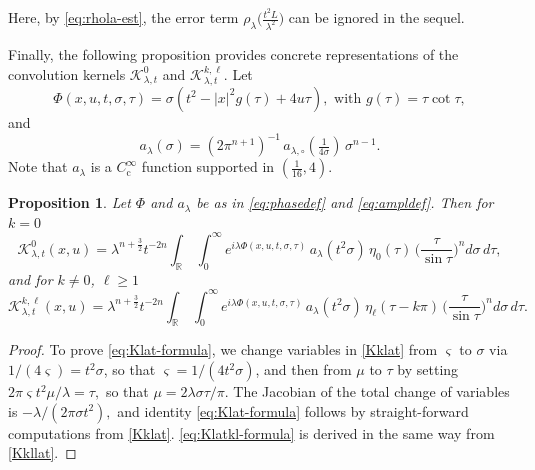 \documentclass[leqno]{amsart}
\newtheorem{proposition}[theorem]{Proposition}
\theoremstyle{definition}
\theoremstyle{remark}
\numberwithin{equation}{section}
\newcommand{\R}{\mathbb{R}}
\newcommand\la{{\lambda}}
\newcommand\Coi{{C^\infty_{\mathrm c}}}
\newcommand\sK{{\mathscr {K}}}
\begin{document}
Here, by \eqref{eq:rhola-est}, the error term $\rho_\lambda\big(\tfrac{t^2L}{\lambda^2}\big)$ can be ignored in the sequel. 
\smallskip

Finally, the  following proposition provides  concrete representations of the convolution kernels $\sK^0_{\la,t}$ and 
$\sK^{k,\ell}_{\la,t}.$  Let
\begin{equation} \label{eq:phasedef}
 \Phi(x,u,t,\sigma,\tau) =\sigma( t^2-|x|^2 g(\tau) +4u\tau), \text{ with } g(\tau)=\tau\cot \tau, 
  \end{equation} and 
 \begin{equation}\label{eq:ampldef}  a_\la(\sigma)=  (2\pi^{n+1})^{-1} \, a_{\la,\circ}(\tfrac 1{4\sigma}) \, \sigma^{n-1}. \end{equation}
 Note that $a_\la$ is a $\Coi $ function  supported in $(\frac 1{16},4)$. 

\begin{proposition}\label{lem:decomp} 
  Let $\Phi$ and  $a_\la$ be as in \eqref{eq:phasedef} and  \eqref{eq:ampldef}. Then for  $k=0$ 
\begin{equation}\label{eq:Klat-formula}
\sK_{\lambda,t}^{0}(x, u) = \lambda^{ n+\frac{3}{2}} t^{-2n} \int_\R \, \int_0^\infty   e^{i\lambda\Phi(x,u,t,\sigma,\tau)} \, a_\lambda(t^2\sigma) \, \eta_0( \tau) \, \Big(\frac{\tau}{\sin\tau}\Big)^{n}  d\sigma \, d\tau,
\end{equation}
and for $k\neq 0$, $\ell\ge 1$
\begin{equation}\label{eq:Klatkl-formula} 
\sK_{\lambda,t}^{k,\ell}(x, u) = \lambda^{ n+\frac{3}{2}} t^{-2n}  \int_\R \, \int_0^\infty  e^{i\lambda\Phi(x,u,t,\sigma,\tau)} \, a_\lambda(t^2\sigma) \, \eta_\ell( \tau -k \pi) \, \Big(\frac{\tau}{\sin\tau}\Big)^{n}  d\sigma \, d\tau.
\end{equation}
\end{proposition}

\begin{proof} 
To prove \eqref{eq:Klat-formula}, we  change variables in \eqref{Kklat} from $\varsigma$ to $\sigma$ via $1/(4\varsigma)=t^2\sigma$, so that $\varsigma = 1/(4t^2\sigma)$, and then from $\mu$ to $\tau$ by setting $2\pi\varsigma t^2\mu/\lambda=\tau,$ so that $\mu=2 \la  \sigma\tau/\pi$. The Jacobian of the total change of variables is $-\la/(2\pi\sigma t^2),$ and identity \eqref{eq:Klat-formula} follows by straight-forward computations from \eqref{Kklat}.  \eqref{eq:Klatkl-formula} is derived  in the same way from \eqref{Kkllat}.
\end{proof}
\end{document}
